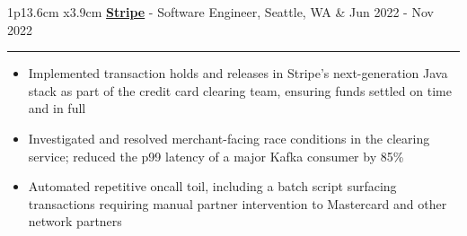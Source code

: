 \documentclass[11pt]{article}
\newcommand{\cvevent}[4]
{

\begin{tabular*}{1\textwidth}{p{13.6cm}  x{3.9cm}}
	\textbf{#2} - \textcolor{bgcol}{#3} &   \vspace{2.5pt}\textcolor{sectcol}{#1}
\end{tabular*}

\vspace{-8pt}
\textcolor{softcol}{\hrule}
\vspace{-3pt}
    #4
}
\begin{document}
\cvevent{Jun 2022 - Nov 2022}{\href{https://stripe.com/}{Stripe}}{Software Engineer, Seattle, WA}{
    \begin{itemize}
        \item Implemented transaction holds and releases in Stripe's next-generation Java stack as part of the credit card clearing team, ensuring funds settled on time and in full
        \item Investigated and resolved merchant-facing race conditions in the clearing service; reduced the p99 latency of a major Kafka consumer by 85\%
        \item Automated repetitive oncall toil, including a batch script surfacing transactions requiring manual partner intervention to Mastercard and other network partners
    \end{itemize}
}


        
\end{document}
